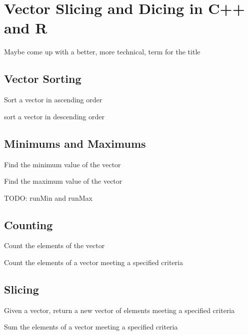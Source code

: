 \chapter{Vector Slicing and Dicing in C++ and R}
Maybe come up with a better, more technical, term for the title

\section{Vector Sorting}
Sort a vector in ascending order


sort a vector in descending order

\section{Minimums and Maximums}
Find the minimum value of the vector


Find the maximum value of the vector


TODO: runMin and runMax

\section{Counting}
Count the elements of the vector


Count the elements of a vector meeting a specified criteria

\section{Slicing}
Given a vector, return a new vector of elements meeting a specified criteria

Sum the elements of a vector meeting a specified criteria